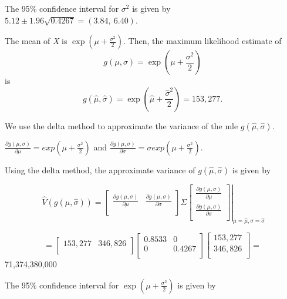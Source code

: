 \documentclass[]{book}
\theoremstyle{definition}
\theoremstyle{definition}
\theoremstyle{definition}
\theoremstyle{remark}
\begin{document}
The 95\% confidence interval for \(\sigma^{2}\) is given by
\(5.12 \pm 1.96\sqrt{0.4267} = \left( 3.84,\ 6.40 \right)\).

The mean of \emph{X} is
\(\exp\left( \mu + \frac{\sigma^{2}}{2} \right)\). Then, the maximum
likelihood estimate of
\[g\left( \mu,\sigma \right) = \exp\left( \mu + \frac{\sigma^{2}}{2} \right)\]
is
\[g\left( \hat{\mu},\hat{\sigma} \right) = \exp\left( \hat{\mu} + \frac{{\hat{\sigma}}^{2}}{2} \right) = 153,277.\]

We use the delta method to approximate the variance of the mle
\(g\left( \hat{\mu},\hat{\sigma} \right)\).

\(\frac{\partial g\left( \mu,\sigma \right)}{\partial\mu} = exp\left( \mu + \frac{\sigma^{2}}{2} \right)\)
and
\(\frac{\partial g\left( \mu,\sigma \right)}{\partial\sigma} = \sigma exp\left( \mu + \frac{\sigma^{2}}{2} \right)\).

Using the delta method, the approximate variance of
\(g\left( \hat{\mu},\hat{\sigma} \right)\) is given by

\[\left. \ \hat{V}\left( g\left( \hat{\mu},\hat{\sigma} \right) \right) = \begin{bmatrix}
\frac{\partial g\left( \mu,\sigma \right)}{\partial\mu} & \frac{\partial g\left( \mu,\sigma \right)}{\partial\sigma} \\
\end{bmatrix}\Sigma\begin{bmatrix}
\frac{\partial g\left( \mu,\sigma \right)}{\partial\mu} \\
\frac{\partial g\left( \mu,\sigma \right)}{\partial\sigma} \\
\end{bmatrix} \right|_{\mu = \hat{\mu},\sigma = \hat{\sigma}}\]

\[= \begin{bmatrix}
153,277 & 346,826 \\
\end{bmatrix}\begin{bmatrix}
0.8533 & 0 \\
0 & 0.4267 \\
\end{bmatrix}\begin{bmatrix}
153,277 \\
346,826 \\
\end{bmatrix} =\]71,374,380,000

The 95\% confidence interval for
\(\exp\left( \mu + \frac{\sigma^{2}}{2} \right)\) is given by
\end{document}
